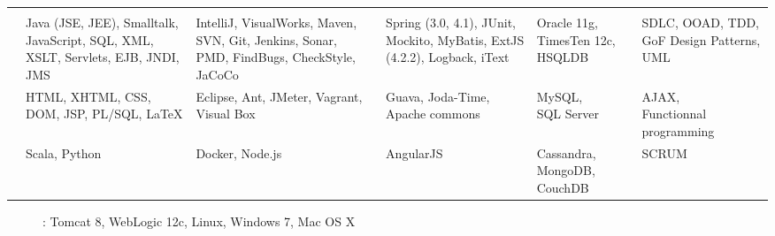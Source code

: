 \section{}

\begin{tabular}{@{}L{0.8in}L{1.35in}L{1.35in}L{1.13in}L{0.85in}L{1.2in}@{}}
  &
  \textbf{} &
  \textbf{} &
  \textbf{} &
  \textbf{} &
  \textbf{} \\

  \small{\textit{}} &
  \small{Java (JSE, JEE), Smalltalk, JavaScript, SQL, XML, XSLT, Servlets, EJB, JNDI, JMS} &
  \small{IntelliJ, VisualWorks, Maven, SVN, Git, Jenkins, Sonar, PMD, FindBugs, CheckStyle, JaCoCo} &
  \small{Spring (3.0, 4.1), JUnit, Mockito, MyBatis, ExtJS (4.2.2), Logback, iText} &
  \small{Oracle 11g, TimesTen 12c, HSQLDB} &
  \small{SDLC, OOAD, TDD, GoF Design Patterns, UML} \\

  \small{\textit{}} &
  \small{HTML, XHTML, CSS, DOM, JSP, PL/SQL, \LaTeX} &
  \small{Eclipse, Ant, JMeter, Vagrant, Visual Box} &
  \small{Guava, Joda-Time, Apache commons} &
  \small{MySQL, \newline SQL Server} &
  \small{AJAX, \newline Functionnal programming} \\

  \small{\textit{}} &
  \small{Scala, Python} &
  \small{Docker, Node.js} &
  \small{AngularJS} &
  \small{Cassandra, MongoDB, CouchDB} &
  \small{SCRUM}
\end{tabular}

\vspace{2pt}

\begin{description}
  \item
    []
    {: Tomcat 8, WebLogic 12c, Linux, Windows 7, Mac OS X}
\end{description}